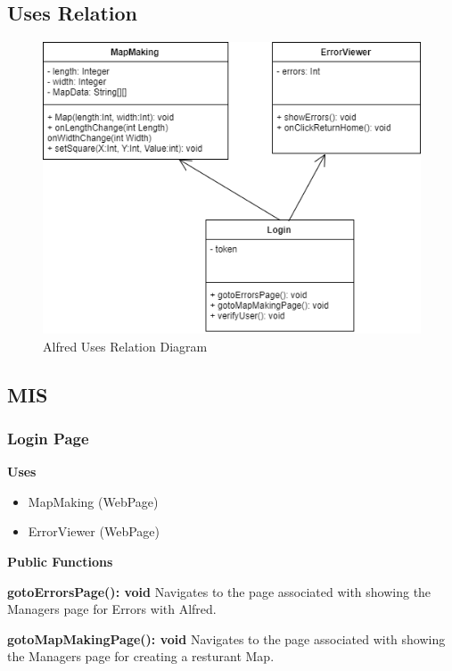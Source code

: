 \documentclass [10pt]{article}
\begin{document}
\subsection{Uses Relation}

\begin{figure} [h!]
	\centering
	\includegraphics [scale = 0.4] {figures/Manager_UsesDiagram.png}
	\caption{Alfred Uses Relation Diagram}
\end{figure}

\subsection{MIS}

\subsubsection{Login Page}
\textbf{Uses}
\begin{itemize}
	\item MapMaking (WebPage)
	\item ErrorViewer (WebPage)
\end{itemize}



\textbf{Public Functions}

\textbf{gotoErrorsPage(): void}
Navigates to the page associated with showing the Managers page for Errors with Alfred.

\textbf{gotoMapMakingPage(): void}
Navigates to the page associated with showing the Managers page for creating a resturant Map.
\end{document}
